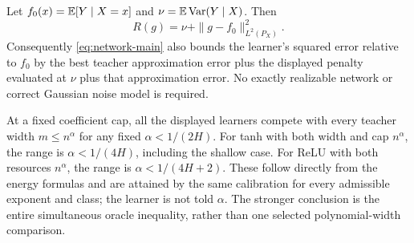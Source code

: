 Let $f_0(x)=\mathbb E[Y\mid X=x]$ and $\nu=\mathbb E\operatorname{Var}(Y\mid X)$. Then
\[
 R(g)=\nu+\|g-f_0\|_{L^2(P_X)}^2.
\]
Consequently \eqref{eq:network-main} also bounds the learner's squared error relative to $f_0$ by the best teacher approximation error plus the displayed penalty evaluated at $\nu$ plus that approximation error. No exactly realizable network or correct Gaussian noise model is required.

At a fixed coefficient cap, all the displayed learners compete with every teacher width $m\le n^\alpha$ for any fixed $\alpha<1/(2H)$. For tanh with both width and cap $n^\alpha$, the range is $\alpha<1/(4H)$, including the shallow case. For ReLU with both resources $n^\alpha$, the range is $\alpha<1/(4H+2)$. These follow directly from the energy formulas and are attained by the same calibration for every admissible exponent and class; the learner is not told $\alpha$. The stronger conclusion is the entire simultaneous oracle inequality, rather than one selected polynomial-width comparison.
